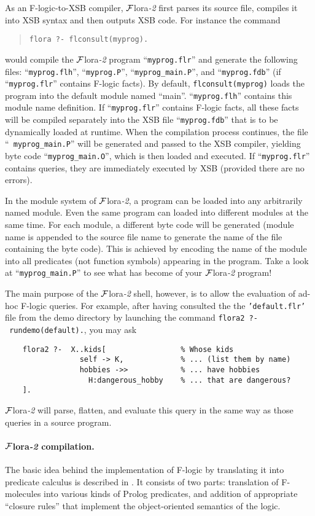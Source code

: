 \documentclass[11pt]{article}
\newcommand{\FLORA}{{\mbox{${\cal F}${\sc lora}\rm\emph{-2}}}\xspace}
\newcommand{\fl}{\mbox{F-logic}\xspace}
\begin{document}
As an \fl-to-XSB compiler, \FLORA first parses its source file,
compiles it into XSB syntax and then outputs XSB code. For instance the command
\begin{quote}
\verb|flora ?- flconsult(myprog).|
\end{quote}
would compile the \FLORA program ``{\tt myprog.flr}'' and generate the
following files: ``{\tt myprog.flh}'', ``{\tt myprog.P}'',
``{\tt myprog\_main.P}'', and ``{\tt myprog.fdb}'' (if ``{\tt myprog.flr}''
contains \fl facts).  By default, {\tt flconsult(myprog)} loads the
program into the default module named ``main''. ``{\tt myprog.flh}''
contains this module name definition.  If ``{\tt myprog.flr}''
contains \fl facts, all these facts will be compiled separately into
the XSB file ``{\tt myprog.fdb}'' that is to be dynamically loaded at
runtime. When the compilation process continues, the file ``{\tt
myprog\_main.P}'' will be generated and passed to the XSB compiler,
yielding byte code ``{\tt myprog\_main.O}'', which is then loaded and
executed.  If ``{\tt myprog.flr}'' contains queries, they are
immediately executed by XSB (provided there are no errors).

In the module system of \FLORA, a program can be loaded into any
arbitrarily named module. Even the same program can loaded into
different modules at the same time. For each module, a different byte
code will be generated (module name is appended to the source file
name to generate the name of the file containing the byte code). This
is achieved by encoding the name of the module into all predicates
(not function symbols) appearing in the program. Take a look at
``{\tt myprog\_main.P}'' to see what has become of your \FLORA program!

The main purpose of the \FLORA shell, however, is to allow the evaluation
of ad-hoc \fl queries. For example, after having consulted the
the \texttt{'default.flr'} file from the demo directory by launching
the command \texttt{flora2~?-~rundemo(default).}, you may ask
\begin{verbatim}
    flora2 ?-  X..kids[                 % Whose kids
                 self -> K,             % ... (list them by name)
                 hobbies ->>            % ... have hobbies
                   H:dangerous_hobby    % ... that are dangerous?
    ]. 
\end{verbatim}
\FLORA will parse, flatten, and evaluate this query in the same way as
those queries in a source program.


\paragraph{\FLORA compilation.}
The basic idea behind the implementation of \fl by translating it into
predicate calculus is described in \cite{KLW95}. It consists of two parts:
translation of F-molecules into various kinds of Prolog predicates, and
addition of appropriate ``closure rules'' that implement the
object-oriented semantics of the logic.
\end{document}

